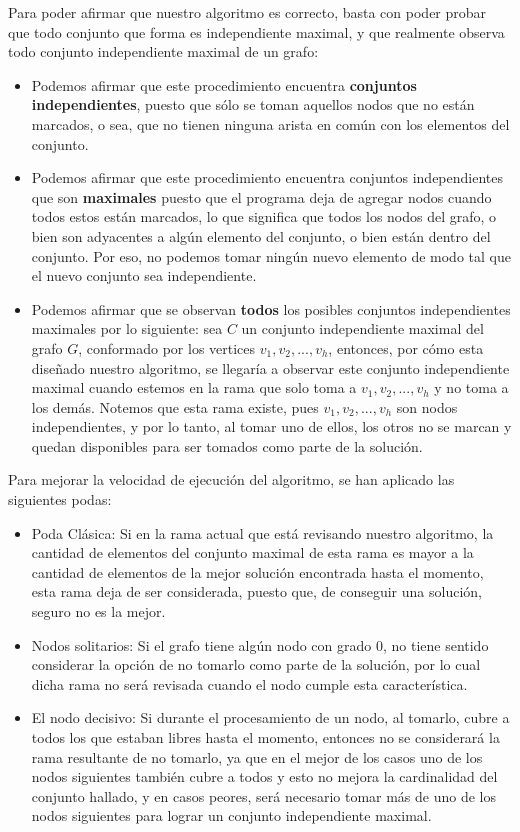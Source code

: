 Para poder afirmar que nuestro algoritmo es correcto, basta con poder probar que todo conjunto que forma es independiente maximal, y que realmente observa todo conjunto independiente maximal de un grafo:

\begin{itemize}
	\item Podemos afirmar que este procedimiento encuentra {\bf conjuntos independientes}, puesto que sólo se toman aquellos nodos que no están marcados, o sea, que no tienen ninguna arista en común con los elementos del conjunto.
	\item Podemos afirmar que este procedimiento encuentra conjuntos independientes que son {\bf maximales} puesto que el programa deja de agregar nodos cuando todos estos están marcados, lo que significa que todos los nodos del grafo, o bien son adyacentes a algún elemento del conjunto, o bien están dentro del conjunto. Por eso, no podemos tomar ningún nuevo elemento de modo tal que el nuevo conjunto sea independiente.
	\item Podemos afirmar que se observan {\bf todos} los posibles conjuntos independientes maximales por lo siguiente:  sea $C$ un conjunto independiente maximal del grafo $G$, conformado por los vertices $v_{1}, v_{2}, ... , v_{h}$, entonces, por cómo esta diseñado nuestro algoritmo, se llegaría a observar este conjunto independiente maximal cuando estemos en la rama que solo toma a $v_{1}, v_{2}, ... , v_{h}$ y no toma a los demás. Notemos que esta rama existe, pues $v_{1}, v_{2}, ... , v_{h}$ son nodos independientes, y por lo tanto, al tomar uno de ellos, los otros no se marcan y quedan disponibles para ser tomados como parte de la solución.
\end{itemize}

Para mejorar la velocidad de ejecución del algoritmo, se han aplicado las siguientes podas:

\begin{itemize}
	\item Poda Clásica: Si en la rama actual que está revisando nuestro algoritmo, la cantidad de elementos del conjunto maximal de esta rama es mayor a la cantidad de elementos de la mejor solución encontrada hasta el momento, esta rama deja de ser considerada, puesto que, de conseguir una solución, seguro no es la mejor.
	\item Nodos solitarios: Si el grafo tiene algún nodo con grado 0, no tiene sentido considerar la opción de no tomarlo como parte de la solución, por lo cual dicha rama no será revisada cuando el nodo cumple esta característica.
	\item El nodo decisivo: Si durante el procesamiento de un nodo, al tomarlo, cubre a todos los que estaban libres hasta el momento, entonces no se considerará la rama resultante de no tomarlo, ya que en el mejor de los casos uno de los nodos siguientes también cubre a todos y esto no mejora la cardinalidad del conjunto hallado, y en casos peores, será necesario tomar más de uno de los nodos siguientes para lograr un conjunto independiente maximal.
\end{itemize}

